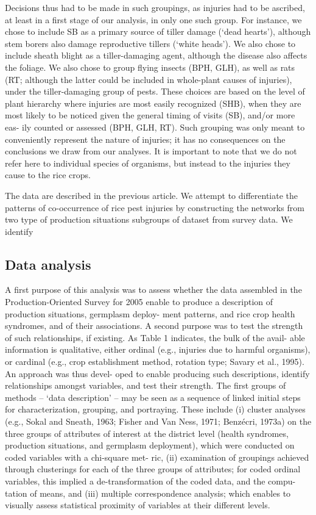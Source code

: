 \documentclass{frontiersSCNS} %
\begin{document}
Decisions thus had to be made in such groupings, as injuries had to be ascribed, at least in a first stage of our analysis, in only one such group. For instance, we chose to include SB as a primary source of tiller damage (‘dead hearts’), although stem borers also damage reproductive tillers (‘white heads’). We also chose to include sheath blight as a tiller-damaging agent, although the disease also affects the foliage. We also chose to group flying insects (BPH, GLH), as well as rats (RT; although the latter could be included in whole-plant causes of injuries), under the tiller-damaging group of pests. These choices are based on the level of plant hierarchy where injuries are most easily recognized (SHB), when they are most likely to be noticed given the general timing of visits (SB), and/or more eas- ily counted or assessed (BPH, GLH, RT). Such grouping was only meant to conveniently represent the nature of injuries; it has no consequences on the conclusions we draw from our analyses. It is important to note that we do not refer here to individual species of organisms, but instead to the injuries they cause to the rice crops.

The data are described in the previous article. We attempt to differentiate the patterns of co-occurrence of rice pest injuries by constructing the networks from two type of production situations subgroups of dataset from survey data. We identify 

\subsection{Data analysis}

A first purpose of this analysis was to assess whether the data assembled in the Production-Oriented Survey for 2005 enable to produce a description of production situations, germplasm deploy- ment patterns, and rice crop health syndromes, and of their associations. A second purpose was to test the strength of such relationships, if existing. As Table 1 indicates, the bulk of the avail- able information is qualitative, either ordinal (e.g., injuries due to harmful organisms), or cardinal (e.g., crop establishment method, rotation type; Savary et al., 1995). An approach was thus devel- oped to enable producing such descriptions, identify relationships amongst variables, and test their strength.
The first groups of methods – ‘data description’ – may be seen as a sequence of linked initial steps for characterization, grouping, and portraying. These include (i) cluster analyses (e.g., Sokal and Sneath, 1963; Fisher and Van Ness, 1971; Benzécri, 1973a) on the three groups of attributes of interest at the district level (health syndromes, production situations, and germplasm deployment), which were conducted on coded variables with a chi-square met- ric, (ii) examination of groupings achieved through clusterings for each of the three groups of attributes; for coded ordinal variables, this implied a de-transformation of the coded data, and the compu- tation of means, and (iii) multiple correspondence analysis; which enables to visually assess statistical proximity of variables at their different levels.
\end{document}
